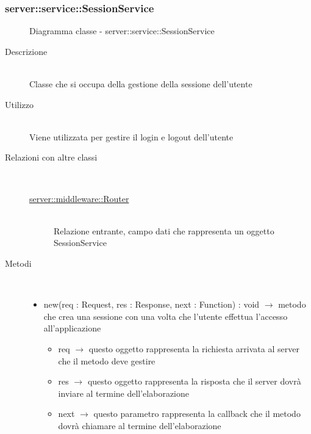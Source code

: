 \subsubsection[SessionService]{server::service::SessionService}
\begin{figure}[H]
	\centering
	\caption{Diagramma classe - server::service::SessionService}
\end{figure}\begin{description}
\item[Descrizione] \hfill \\
Classe che si occupa della gestione della sessione dell'utente
\item[Utilizzo] \hfill \\
Viene utilizzata per gestire il login e logout dell'utente
\item[Relazioni con altre classi] \hfill \\
\vspace{-7mm}
\begin{description}
	\item[\hyperlink{server::middleware::Router}{server::middleware::Router}] \hfill \\
	Relazione entrante, campo dati che rappresenta un oggetto SessionService
\end{description}

\item[Metodi] \hfill \\
\vspace{-7mm}
\begin{itemize}
	\item new(req : Request, res : Response, next : Function) : void $\rightarrow$ metodo che crea una sessione con una volta che l'utente effettua l'accesso all'applicazione\begin{itemize}
		\item req $\rightarrow$ questo oggetto rappresenta la richiesta arrivata al server che il metodo deve gestire
		\item res $\rightarrow$ questo oggetto rappresenta la risposta che il server dovrà inviare al termine dell'elaborazione
		\item next $\rightarrow$ questo parametro rappresenta la callback che il metodo dovrà chiamare al termine dell'elaborazione
	\end{itemize}
	

\end{itemize}
\end{description}
